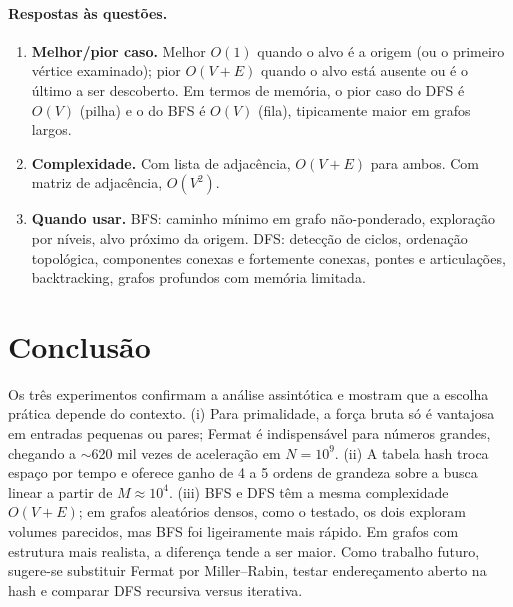 \documentclass{SBCbookchapter}
\begin{document}
\paragraph{Respostas às questões.}
\begin{enumerate}
  \item \textbf{Melhor/pior caso.} Melhor $O(1)$ quando o alvo é a
        origem (ou o primeiro vértice examinado); pior $O(V+E)$ quando
        o alvo está ausente ou é o último a ser descoberto. Em termos
        de memória, o pior caso do DFS é $O(V)$ (pilha) e o do BFS é
        $O(V)$ (fila), tipicamente maior em grafos largos.
  \item \textbf{Complexidade.} Com lista de adjacência, $O(V+E)$ para
        ambos. Com matriz de adjacência, $O(V^2)$.
  \item \textbf{Quando usar.} BFS: caminho mínimo em grafo não-ponderado,
        exploração por níveis, alvo próximo da origem. DFS: detecção
        de ciclos, ordenação topológica, componentes conexas e
        fortemente conexas, pontes e articulações, backtracking,
        grafos profundos com memória limitada.
\end{enumerate}

\section{Conclusão}
Os três experimentos confirmam a análise assintótica e mostram que a
escolha prática depende do contexto. (i) Para primalidade, a força
bruta só é vantajosa em entradas pequenas ou pares; Fermat é
indispensável para números grandes, chegando a $\sim$620 mil vezes de
aceleração em $N = 10^9$. (ii) A tabela hash troca espaço por tempo e
oferece ganho de 4 a 5 ordens de grandeza sobre a busca linear a
partir de $M \approx 10^4$. (iii) BFS e DFS têm a mesma complexidade
$O(V+E)$; em grafos aleatórios densos, como o testado, os dois
exploram volumes parecidos, mas BFS foi ligeiramente mais rápido. Em
grafos com estrutura mais realista, a diferença tende a ser maior.
Como trabalho futuro, sugere-se substituir Fermat por Miller--Rabin,
testar endereçamento aberto na hash e comparar DFS recursiva versus
iterativa.
\end{document}
